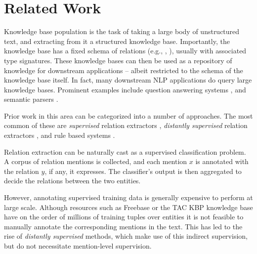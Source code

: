\chapter{Related Work}

%
%

Knowledge base population is the task of taking a large body of unstructured text,
  and extracting from it a structured knowledge base.
Importantly, the knowledge base has a fixed schema of relations (e.g.,
  , ), usually with associated type signatures.
These knowledge bases can then be used as a repository of knowledge for
  downstream applications -- albeit restricted to the schema of the knowledge base itself.
In fact, many downstream NLP applications do query large knowledge bases.
Prominent examples include
  question answering systems
    \cite{key:2001voorhees-trec},
  and semantic parsers
    \cite{key:1996zelle-semantics,key:2007zettlemoyer-semantics,key:2013kwiatkowski-semantics,key:2014berant-semantics}.

Prior work in this area can be categorized into a number of approaches.
The most common of these are \textit{supervised} relation extractors
  \cite{key:2004doddington-ace,key:2005zhou-ace,key:2007surdeanu-ace},
  \textit{distantly supervised} relation extractors
  \cite{key:1999craven-distsup,key:2007wu-distsup,key:2009mintz-distsup,key:2011sun-kbp},
  and rule based systems
  \cite{key:1997soderland-kbp,key:2010grishman-kbp,key:2010chen-kbp}.


Relation extraction can be naturally cast as a supervised classification problem.
A corpus of relation mentions is collected,
  and each mention $x$ is annotated
  with the relation $y$, if any, it expresses. The classifier's output
  is then aggregated to decide the relations between the two entities.

However, annotating supervised training data is generally
  expensive to perform at large scale.
Although resources such as Freebase or the TAC KBP knowledge base
  have on the order of millions of training tuples over
  entities it is not feasible to manually annotate the 
  corresponding mentions in the text.
This has led to the rise of \textit{distantly supervised} methods, which
  make use of this indirect supervision, but do not
  necessitate mention-level supervision.



